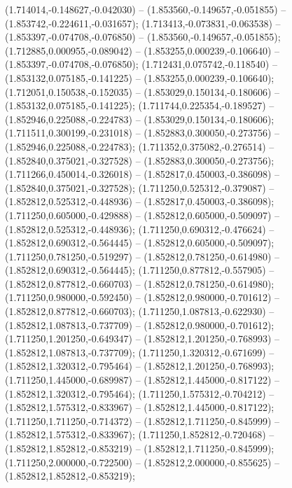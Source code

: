  (1.714014,-0.148627,-0.042030) -- (1.853560,-0.149657,-0.051855) -- (1.853742,-0.224611,-0.031657);
 (1.713413,-0.073831,-0.063538) -- (1.853397,-0.074708,-0.076850) -- (1.853560,-0.149657,-0.051855);
 (1.712885,0.000955,-0.089042) -- (1.853255,0.000239,-0.106640) -- (1.853397,-0.074708,-0.076850);
 (1.712431,0.075742,-0.118540) -- (1.853132,0.075185,-0.141225) -- (1.853255,0.000239,-0.106640);
 (1.712051,0.150538,-0.152035) -- (1.853029,0.150134,-0.180606) -- (1.853132,0.075185,-0.141225);
 (1.711744,0.225354,-0.189527) -- (1.852946,0.225088,-0.224783) -- (1.853029,0.150134,-0.180606);
 (1.711511,0.300199,-0.231018) -- (1.852883,0.300050,-0.273756) -- (1.852946,0.225088,-0.224783);
 (1.711352,0.375082,-0.276514) -- (1.852840,0.375021,-0.327528) -- (1.852883,0.300050,-0.273756);
 (1.711266,0.450014,-0.326018) -- (1.852817,0.450003,-0.386098) -- (1.852840,0.375021,-0.327528);
 (1.711250,0.525312,-0.379087) -- (1.852812,0.525312,-0.448936) -- (1.852817,0.450003,-0.386098);
 (1.711250,0.605000,-0.429888) -- (1.852812,0.605000,-0.509097) -- (1.852812,0.525312,-0.448936);
 (1.711250,0.690312,-0.476624) -- (1.852812,0.690312,-0.564445) -- (1.852812,0.605000,-0.509097);
 (1.711250,0.781250,-0.519297) -- (1.852812,0.781250,-0.614980) -- (1.852812,0.690312,-0.564445);
 (1.711250,0.877812,-0.557905) -- (1.852812,0.877812,-0.660703) -- (1.852812,0.781250,-0.614980);
 (1.711250,0.980000,-0.592450) -- (1.852812,0.980000,-0.701612) -- (1.852812,0.877812,-0.660703);
 (1.711250,1.087813,-0.622930) -- (1.852812,1.087813,-0.737709) -- (1.852812,0.980000,-0.701612);
 (1.711250,1.201250,-0.649347) -- (1.852812,1.201250,-0.768993) -- (1.852812,1.087813,-0.737709);
 (1.711250,1.320312,-0.671699) -- (1.852812,1.320312,-0.795464) -- (1.852812,1.201250,-0.768993);
 (1.711250,1.445000,-0.689987) -- (1.852812,1.445000,-0.817122) -- (1.852812,1.320312,-0.795464);
 (1.711250,1.575312,-0.704212) -- (1.852812,1.575312,-0.833967) -- (1.852812,1.445000,-0.817122);
 (1.711250,1.711250,-0.714372) -- (1.852812,1.711250,-0.845999) -- (1.852812,1.575312,-0.833967);
 (1.711250,1.852812,-0.720468) -- (1.852812,1.852812,-0.853219) -- (1.852812,1.711250,-0.845999);
 (1.711250,2.000000,-0.722500) -- (1.852812,2.000000,-0.855625) -- (1.852812,1.852812,-0.853219);
